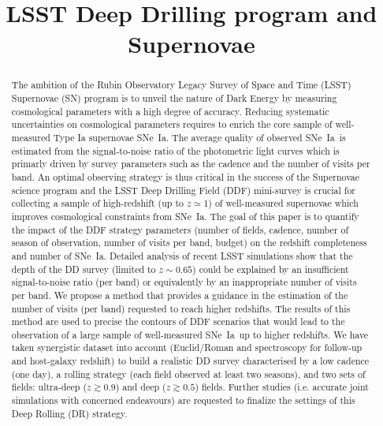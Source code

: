 \documentclass[skiphelvet,twocolumn]{aastex63}
\newcommand{\sne}{{SNe~Ia}}
\newcommand{\sn}{{SN}}
\begin{document}
\title{LSST Deep Drilling program and Supernovae}



\maketitlepre

\begin{abstract}
  
  The ambition of the Rubin Observatory Legacy Survey of Space and Time (LSST) Supernovae (\sn) program is to unveil the nature of Dark Energy by measuring cosmological parameters with a high degree of accuracy. Reducing systematic uncertainties on cosmological parameters requires to enrich the core sample of well-measured Type Ia supernovae \sne. The average quality of observed \sne~is estimated from the signal-to-noise ratio of the photometric light curves which is primarly driven by survey parameters such as the cadence and the number of visits per band. An optimal observing strategy is thus critical in the success of the Supernovae science program and the LSST 
Deep Drilling Field (DDF) mini-survey is crucial for collecting a sample of high-redshift (up to $z\simeq$1) of well-measured supernovae which improves cosmological constraints from \sne. The goal of this paper is to quantify the impact of the DDF strategy parameters (number of fields, cadence, number of season of observation, number of visits per band, budget) on the redshift completeness and number of \sne. Detailed analysis of recent LSST simulations show that the depth of the DD survey (limited to $z\sim0.65$) could be explained by an insufficient signal-to-noise ratio (per band) or equivalently by an inappropriate number of visits per band. We propose a method that provides a guidance in the estimation of the number of visits (per band) requested to reach higher redshifts. The results of this method are used to precise the contours of DDF scenarios that would lead to the observation of a large sample of well-measured \sne~up to higher redshifts. We have taken synergistic dataset into account (Euclid/Roman and spectroscopy for follow-up and host-galaxy redshift) to build a realistic DD survey characterised by a low cadence (one day), a rolling strategy (each field observed at least two seasons), and two sets of fields: ultra-deep ($z\gtrsim0.9$) and deep ($z\gtrsim0.5$) fields. Further studies (i.e. accurate joint simulations with concerned endeavours) are requested to finalize the settings of this Deep Rolling (DR) strategy.

\end{abstract}
\end{document}

